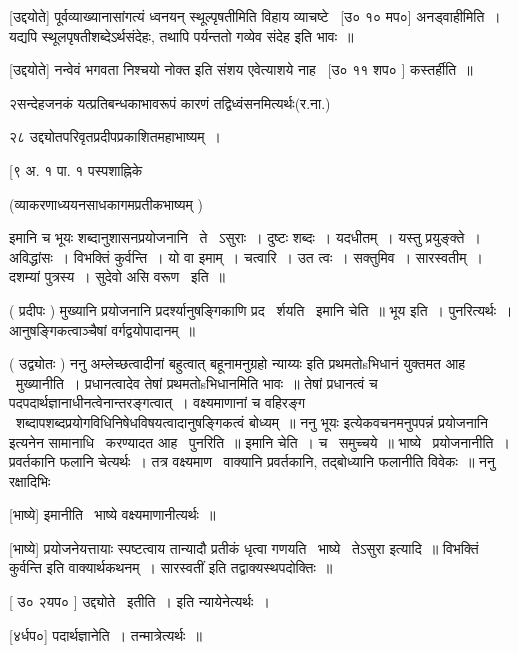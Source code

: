 \documentclass[11pt, openany]{book}
\begin{document}
 [उद्दयोते] पूर्वव्याख्यानासांगत्यं ध्वनयन् स्थूल्पृषतीमिति विहाय
व्याचष्टे \textendash\ [उ० १० मप०] अनड्वाहीमिति~। यद्यपि
स्थूलपृषतीशब्देऽर्थसंदेहः, तथापि पर्यन्ततो गव्येव संदेह इति भावः~॥ 

 [उद्दयोते] नन्वेवं भगवता निश्चयो नोक्त इति संशय एवेत्याशये
नाह \textendash\ [उ० ११ शप० ] कस्तर्हीति~॥ 



२सन्देहजनकं यत्प्रतिबन्धकाभावरूपं कारणं तद्विध्वंसनमित्यर्थः(र.ना.) 

२८ उद्द्योतपरिवृतप्रदीपप्रकाशितमहाभाष्यम्~। 

 [९ अ. १ पा. १ पस्पशाह्निके



 (व्याकरणाध्ययनसाधकागमप्रतीकभाष्यम् ) 

 इमानि च भूयः शब्दानुशासनप्रयोजनानि \textendash\ ते \textendash\ ऽसुराः~। दुष्टः शब्दः~। 
यदधीतम्~। यस्तु प्रयुङ्क्ते~। अविद्धांसः~। विभक्तिं कुर्वन्ति~। यो वा
इमाम्~। चत्वारि~। उत त्वः~। सक्तुमिव~। सारस्वतीम्~। दशम्यां पुत्रस्य~। 
सुदेवो असि वरूण \textendash\ इति~॥ 

 ( प्रदीपः ) मुख्यानि प्रयोजनानि प्रदर्श्यानुषङ्गिकाणि प्रद \textendash\ 
र्शयति \textendash\ इमानि चेति~॥ भूय इति~। पुनरित्यर्थः~। 
आनुषङ्गिकत्वाञ्चैषां वर्गद्वयोपादानम्~॥ 

 ( उद्व्योतः ) ननु अम्लेच्छत्वादीनां बहुत्वात् {\qt बहूनामनुग्रहो
न्याय्यः} इति प्रथमतोsभिधानं युक्तमत आह \textendash\ मुख्यानीति~। प्रधानत्वादेव
तेषां प्रथमतोsभिधानमिति भावः~॥ तेषां प्रधानत्वं च
{\qt पदपदार्थज्ञानाधीनत्वेनान्तरङ्गत्वात्}~। वक्ष्यमाणानां च वहिरङ्ग \textendash\ 
शब्दापशब्दप्रयोगविधिनिषेधविषयत्वादानुषङ्गिकत्वं बोध्यम्~॥ ननु
{\qt भूयः} इत्येकवचनमनुपपन्नं {\qt प्रयोजनानि} इत्यनेन सामानाधि \textendash\ 
करण्यादत आह \textendash\ पुनरिति~॥ इमानि चेति~। च \textendash\ समुच्चये~॥
भाष्ये \textendash\ प्रयोजनानीति~। प्रवर्तकानि फलानि चेत्यर्थः~। तत्र वक्ष्यमाण \textendash\ 
वाक्यानि प्रवर्तकानि, तद्बोध्यानि फलानीति विवेकः~॥ ननु रक्षादिभिः 



 [भाष्ये] इमानीति \textendash\ भाष्ये वक्ष्यमाणानीत्यर्थः~॥ 

 [भाष्ये] प्रयोजनेयत्तायाः स्पष्टत्वाय तान्यादौ प्रतीकं धृत्वा
गणयति \textendash\ भाष्ये \textendash\ तेऽसुरा इत्यादि~॥ {\qt विभक्तिं कुर्वन्ति} इति
वाक्यार्थकथनम्~। {\qt सारस्वतीं} इति तद्वाक्यस्थपदोक्तिः~॥ 

 [ उ० २यप० ] उद्द्योते \textendash\ इतीति~। इति न्यायेनेत्यर्थः~। 

 [४र्धप०] पदार्थज्ञानेति~। तन्मात्रेत्यर्थः~॥ 
\end{document}
